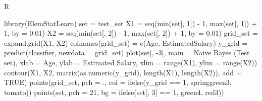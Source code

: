 \documentclass[
]{book}
\newenvironment{Shaded}{\begin{snugshade}}{\end{snugshade}}
\newcommand{\AttributeTok}[1]{\textcolor[rgb]{0.77,0.63,0.00}{#1}}
\newcommand{\ConstantTok}[1]{\textcolor[rgb]{0.00,0.00,0.00}{#1}}
\newcommand{\DecValTok}[1]{\textcolor[rgb]{0.00,0.00,0.81}{#1}}
\newcommand{\FloatTok}[1]{\textcolor[rgb]{0.00,0.00,0.81}{#1}}
\newcommand{\FunctionTok}[1]{\textcolor[rgb]{0.00,0.00,0.00}{#1}}
\newcommand{\NormalTok}[1]{#1}
\newcommand{\OtherTok}[1]{\textcolor[rgb]{0.56,0.35,0.01}{#1}}
\newcommand{\SpecialCharTok}[1]{\textcolor[rgb]{0.00,0.00,0.00}{#1}}
\newcommand{\StringTok}[1]{\textcolor[rgb]{0.31,0.60,0.02}{#1}}
\theoremstyle{definition}
\theoremstyle{definition}
\theoremstyle{definition}
\theoremstyle{definition}
\theoremstyle{remark}
\begin{document}
R

\begin{Shaded}
\begin{Highlighting}[]
\FunctionTok{library}\NormalTok{(ElemStatLearn)}
\NormalTok{set }\OtherTok{=}\NormalTok{ test\_set}
\NormalTok{X1 }\OtherTok{=} \FunctionTok{seq}\NormalTok{(}\FunctionTok{min}\NormalTok{(set[, }\DecValTok{1}\NormalTok{]) }\SpecialCharTok{{-}} \DecValTok{1}\NormalTok{, }\FunctionTok{max}\NormalTok{(set[, }\DecValTok{1}\NormalTok{]) }\SpecialCharTok{+} \DecValTok{1}\NormalTok{, }\AttributeTok{by =} \FloatTok{0.01}\NormalTok{)}
\NormalTok{X2 }\OtherTok{=} \FunctionTok{seq}\NormalTok{(}\FunctionTok{min}\NormalTok{(set[, }\DecValTok{2}\NormalTok{]) }\SpecialCharTok{{-}} \DecValTok{1}\NormalTok{, }\FunctionTok{max}\NormalTok{(set[, }\DecValTok{2}\NormalTok{]) }\SpecialCharTok{+} \DecValTok{1}\NormalTok{, }\AttributeTok{by =} \FloatTok{0.01}\NormalTok{)}
\NormalTok{grid\_set }\OtherTok{=} \FunctionTok{expand.grid}\NormalTok{(X1, X2)}
\FunctionTok{colnames}\NormalTok{(grid\_set) }\OtherTok{=} \FunctionTok{c}\NormalTok{(}\StringTok{\textquotesingle{}Age\textquotesingle{}}\NormalTok{, }\StringTok{\textquotesingle{}EstimatedSalary\textquotesingle{}}\NormalTok{)}
\NormalTok{y\_grid }\OtherTok{=} \FunctionTok{predict}\NormalTok{(classifier, }\AttributeTok{newdata =}\NormalTok{ grid\_set)}
\FunctionTok{plot}\NormalTok{(set[, }\SpecialCharTok{{-}}\DecValTok{3}\NormalTok{], }\AttributeTok{main =} \StringTok{\textquotesingle{}Naive Bayes (Test set)\textquotesingle{}}\NormalTok{,}
     \AttributeTok{xlab =} \StringTok{\textquotesingle{}Age\textquotesingle{}}\NormalTok{, }\AttributeTok{ylab =} \StringTok{\textquotesingle{}Estimated Salary\textquotesingle{}}\NormalTok{,}
     \AttributeTok{xlim =} \FunctionTok{range}\NormalTok{(X1), }\AttributeTok{ylim =} \FunctionTok{range}\NormalTok{(X2))}
\FunctionTok{contour}\NormalTok{(X1, X2, }\FunctionTok{matrix}\NormalTok{(}\FunctionTok{as.numeric}\NormalTok{(y\_grid), }\FunctionTok{length}\NormalTok{(X1), }\FunctionTok{length}\NormalTok{(X2)), }\AttributeTok{add =} \ConstantTok{TRUE}\NormalTok{)}
\FunctionTok{points}\NormalTok{(grid\_set, }\AttributeTok{pch =} \StringTok{\textquotesingle{}.\textquotesingle{}}\NormalTok{, }\AttributeTok{col =} \FunctionTok{ifelse}\NormalTok{(y\_grid }\SpecialCharTok{==} \DecValTok{1}\NormalTok{, }\StringTok{\textquotesingle{}springgreen3\textquotesingle{}}\NormalTok{, }\StringTok{\textquotesingle{}tomato\textquotesingle{}}\NormalTok{))}
\FunctionTok{points}\NormalTok{(set, }\AttributeTok{pch =} \DecValTok{21}\NormalTok{, }\AttributeTok{bg =} \FunctionTok{ifelse}\NormalTok{(set[, }\DecValTok{3}\NormalTok{] }\SpecialCharTok{==} \DecValTok{1}\NormalTok{, }\StringTok{\textquotesingle{}green4\textquotesingle{}}\NormalTok{, }\StringTok{\textquotesingle{}red3\textquotesingle{}}\NormalTok{))}
\end{Highlighting}
\end{Shaded}
\end{document}
